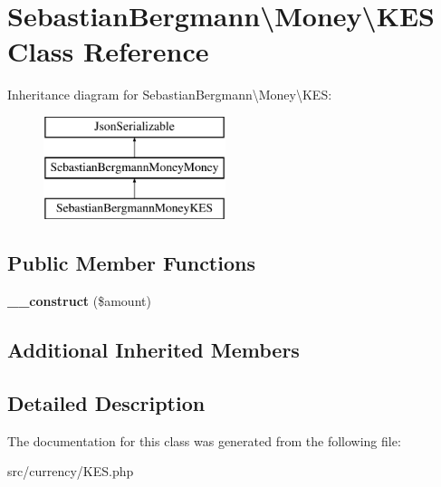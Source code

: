 \hypertarget{classSebastianBergmann_1_1Money_1_1KES}{}\section{Sebastian\+Bergmann\textbackslash{}Money\textbackslash{}K\+E\+S Class Reference}
\label{classSebastianBergmann_1_1Money_1_1KES}
Inheritance diagram for Sebastian\+Bergmann\textbackslash{}Money\textbackslash{}K\+E\+S\+:\begin{figure}[H]
\begin{center}
\leavevmode
\includegraphics[height=3.000000cm]{classSebastianBergmann_1_1Money_1_1KES}
\end{center}
\end{figure}
\subsection*{Public Member Functions}
\begin{DoxyCompactItemize}
\item 
\hypertarget{classSebastianBergmann_1_1Money_1_1KES_ada83cf04abc172cc0603614632d14453}{}{\bfseries \+\_\+\+\_\+construct} (\$amount)\label{classSebastianBergmann_1_1Money_1_1KES_ada83cf04abc172cc0603614632d14453}

\end{DoxyCompactItemize}
\subsection*{Additional Inherited Members}


\subsection{Detailed Description}


The documentation for this class was generated from the following file\+:\begin{DoxyCompactItemize}
\item 
src/currency/K\+E\+S.\+php\end{DoxyCompactItemize}
